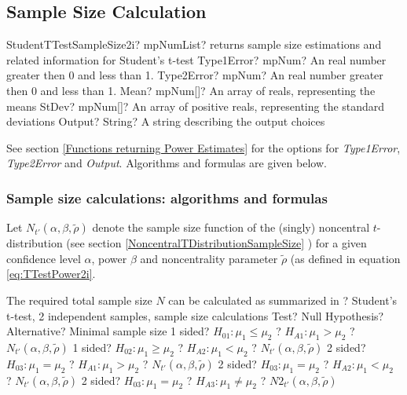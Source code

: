 \newpage
\subsection{Sample Size Calculation}


\begin{mpFunctionsExtract}
	\mpFunctionFiveNotImplemented
	{StudentTTestSampleSize2i? mpNumList? returns sample size estimations and related information for Student's t-test}
	{Type1Error? mpNum? An real number greater then 0 and less than 1.}
	{Type2Error? mpNum? An real number greater then 0 and less than 1.}
	{Mean? mpNum[]? An array of reals, representing the means}
	{StDev? mpNum[]? An array of positive reals, representing the standard deviations}
	{Output? String? A string describing the output choices}
\end{mpFunctionsExtract}

\vspace{0.3cm}
See section \ref{Functions returning Power Estimates} for the options for {\itshape\sffamily Type1Error},  {\itshape\sffamily Type2Error} and {\itshape\sffamily Output}. Algorithms and formulas are given below.



\subsubsection{Sample size calculations: algorithms and formulas}

Let $N_{t'}\left(\alpha, \beta, \widetilde{\rho} \right)$ denote the sample size function of the (singly) noncentral $t$-distribution (see section \ref{NoncentralTDistributionSampleSize} ) for a given confidence level $\alpha$, power $\beta$ and noncentrality parameter $\widetilde{\rho}$ (as defined in equation \ref{eq:TTestPower2i}.


\mpTableFourColsTwoRowsThreeRows
{The required total sample size $N$ can be calculated as summarized in ? Student's t-test, 2 independent samples, sample size calculations}
{Test? Null Hypothesis? Alternative? Minimal sample size}
{1 sided? $H_{01}: \mu_1 \leq \mu_2$ ? $H_{A1}: \mu_1 > \mu_2$ ? $N_{t'}\left(\alpha, \beta, \widetilde{\rho} \right)$}
{1 sided? $H_{02}: \mu_1 \geq \mu_2$ ? $H_{A2}: \mu_1 < \mu_2$ ? $N_{t'}\left(\alpha, \beta, \widetilde{\rho} \right)$}
{2 sided? $H_{03}: \mu_1 = \mu_2$ ? $H_{A1}: \mu_1 > \mu_2$ ? $N_{t'}\left(\alpha, \beta, \widetilde{\rho} \right)$}
{2 sided? $H_{03}: \mu_1 = \mu_2$ ? $H_{A2}: \mu_1 < \mu_2$ ? $N_{t'}\left(\alpha, \beta, \widetilde{\rho} \right)$}
{2 sided? $H_{03}: \mu_1 = \mu_2$ ? $H_{A3}: \mu_1 \neq \mu_2$ ? $N2_{t'}\left(\alpha, \beta, \widetilde{\rho} \right)$}


